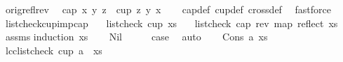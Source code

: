 \begin{isabellebody}
\endisatagproof
{\isafoldproof}%
%
\isadelimproof
\isanewline
%
\endisadelimproof
\isanewline
{}\isamarkupfalse%
\ orig{\isacharunderscore}{\kern0pt}refl{\isacharunderscore}{\kern0pt}rev{\isacharcolon}{\kern0pt}\isanewline
\ \ {\isachardoublequoteopen}cap{}\ x\ y\ z\ {\isacharequal}{\kern0pt}\ cup{}\ {\isacharparenleft}{\kern0pt}{\isacharminus}{\kern0pt}z{\isacharparenright}{\kern0pt}\ {\isacharparenleft}{\kern0pt}{\isacharminus}{\kern0pt}y{\isacharparenright}{\kern0pt}\ {\isacharparenleft}{\kern0pt}{\isacharminus}{\kern0pt}x{\isacharparenright}{\kern0pt}{\isachardoublequoteclose}\isanewline
%
\isadelimproof
\ \ %
\endisadelimproof
%
\isatagproof
{}\isamarkupfalse%
\ cap{}{\isacharunderscore}{\kern0pt}def\ cup{}{\isacharunderscore}{\kern0pt}def\ cross{}{\isacharunderscore}{\kern0pt}def\ \isamarkupfalse%
\ fastforce%
\endisatagproof
{\isafoldproof}%
%
\isadelimproof
\isanewline
%
\endisadelimproof
\isanewline
{}\isamarkupfalse%
\ list{\isacharunderscore}{\kern0pt}check{\isacharunderscore}{\kern0pt}cup{}{\isacharunderscore}{\kern0pt}imp{\isacharunderscore}{\kern0pt}cap{}{\isacharcolon}{\kern0pt}\isanewline
\ \ \ {\isachardoublequoteopen}list{\isacharunderscore}{\kern0pt}check\ cup{}\ xs{\isachardoublequoteclose}\isanewline
\ \ \ {\isachardoublequoteopen}list{\isacharunderscore}{\kern0pt}check\ cap{}\ {\isacharparenleft}{\kern0pt}rev\ {\isacharparenleft}{\kern0pt}map\ reflect\ xs{\isacharparenright}{\kern0pt}{\isacharparenright}{\kern0pt}{\isachardoublequoteclose}%
\isadelimproof
\ %
\endisadelimproof
%
\isatagproof
{}\isamarkupfalse%
\ assms\isanewline
{}\isamarkupfalse%
{\isacharparenleft}{\kern0pt}induction\ xs{\isacharparenright}{\kern0pt}\isanewline
\ \ \isamarkupfalse%
\ Nil\isanewline
\ \ \isamarkupfalse%
\ \isamarkupfalse%
\ {\isacharquery}{\kern0pt}case\ \isamarkupfalse%
\ auto\isanewline
{}\isamarkupfalse%
\isanewline
\ \ \isamarkupfalse%
\ {\isacharparenleft}{\kern0pt}Cons\ a\ xs{\isacharparenright}{\kern0pt}\isanewline
\ \ \isamarkupfalse%
\ lcc{\isacharcolon}{\kern0pt}{\isachardoublequoteopen}list{\isacharunderscore}{\kern0pt}check\ cup{}\ {\isacharparenleft}{\kern0pt}a\ {\isacharhash}{\kern0pt}\ xs{\isacharparenright}{\kern0pt}{\isachardoublequoteclose}\ \isamarkupfalse%

\end{isabellebody}
